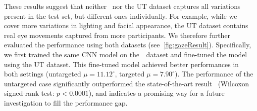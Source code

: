 These results suggest that neither \dataset~nor the UT dataset captures all variations present in the test set, but different ones individually.
For example, while we cover more variations in lighting and facial appearance, the UT dataset contains real eye movements captured from more participants.
We therefore further evaluated the performance using both datasets (see~\autoref{fig:gazeResult}).
Specifically, we first trained the same CNN model on the~\dataset~dataset and fine-tuned the model using the UT dataset.
This fine-tuned model achieved better performances in both settings (untargeted $\mu\!=\!11.12^{\circ}$, targeted $\mu\!=\!7.90^{\circ}$).
The performance of the untargeted case significantly outperformed the state-of-the-art result~\cite{zhang15_cvpr} (Wilcoxon signed-rank test: $p\!<\!0.0001$), and indicates a promising way for a future investigation to fill the performance gap.


